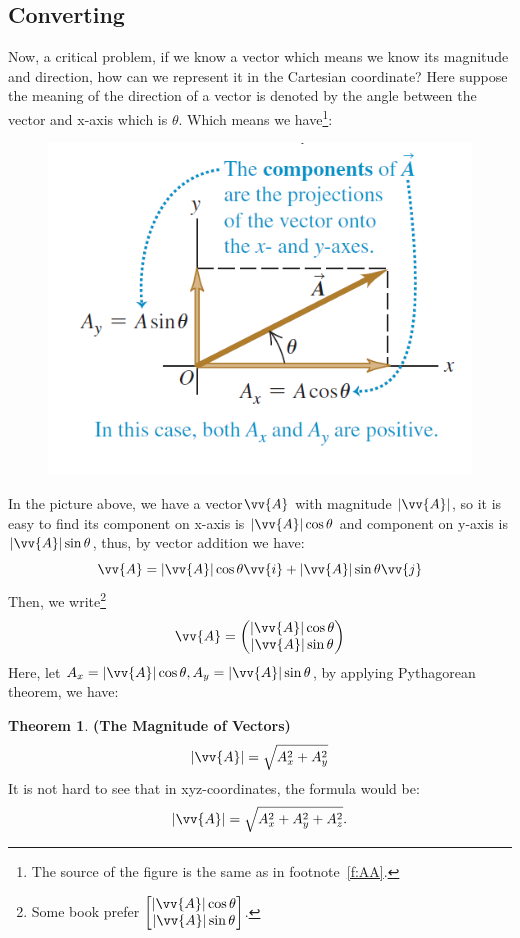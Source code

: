 \documentclass[12pt, a4paper, reqno]{amsart}
\theoremstyle{definition}
\newtheorem{theorem}{Theorem}[subsection] %
\numberwithin{equation}{section} %
\begin{document}
\subsection{Converting}\label{SS:CVT}\hfill

Now, a critical problem, if we know a vector which means we know its magnitude and direction, how can we represent it in the Cartesian coordinate? Here suppose the meaning of the direction of a vector is denoted by the angle between the vector and x-axis which is $\theta$. Which means we have\footnote{The source of the figure is the same as in footnote~\ref{f:AA}.}\label{f:Converting}:

\begin{figure}[h]
	\centering\includegraphics[width=.4\linewidth]{12.png}
	\caption{}
\end{figure}

In the picture above, we have a vector$\vv{A}$ with magnitude $\left|\vv{A}\right|$, so it is easy to find its component on x-axis is $\left|\vv{A}\right|\cos \theta$ and component on y-axis is $\left|\vv{A}\right|\sin \theta$, thus, by vector addition we have:
\begin{equation}\label{E:Converting}
	\vv{A} = \left|\vv{A}\right|\cos \theta \vv{i} + \left|\vv{A}\right|\sin \theta \vv{j}
\end{equation}
Then, we write\footnote{Some book prefer
	$
	\begin{bmatrix}
		\left|\vv{A}\right|\cos \theta	\\
		\left|\vv{A}\right|\sin \theta
	\end{bmatrix}
	$.}\label{f:7}
\begin{equation}\label{E:Coo}
	\vv{A} = 
	\begin{pmatrix}
		\left|\vv{A}\right|\cos \theta	\\
		\left|\vv{A}\right|\sin \theta
	\end{pmatrix}
\end{equation}
Here, let $A_x = \left|\vv{A}\right|\cos \theta, A_y = \left|\vv{A}\right|\sin \theta$, by applying Pythagorean theorem, we have:
\begin{theorem}\label{T:Length} \textbf{(The Magnitude of Vectors)}
	\begin{equation}\label{E:Length}
		\left|\vv{A}\right| = \sqrt{A_x^2 + A_y^2}
	\end{equation}
	It is not hard to see that in xyz-coordinates, the formula would be:
	\begin{equation}\label{E:Length}
		\left|\vv{A}\right| = \sqrt{A_x^2 + A_y^2+ A_z^2}.
	\end{equation}
\end{theorem}
\end{document}
